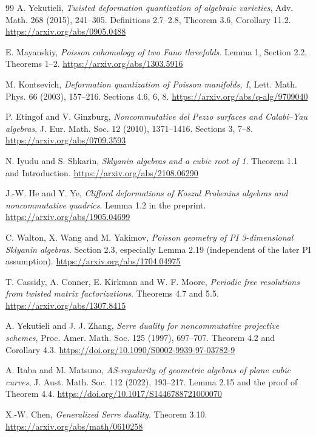 \documentclass[a4paper,11pt]{ltjsarticle}
\theoremstyle{definition}
\begin{document}
\begin{thebibliography}{99}
\small
{}
A. Yekutieli,
\emph{Twisted deformation quantization of algebraic varieties},
Adv. Math. 268 (2015), 241--305.
Definitions 2.7--2.8, Theorem 3.6, Corollary 11.2.
\url{https://arxiv.org/abs/0905.0488}

E. Mayanskiy,
\emph{Poisson cohomology of two Fano threefolds}.
Lemma 1, Section 2.2, Theorems 1--2.
\url{https://arxiv.org/abs/1303.5916}

M. Kontsevich,
\emph{Deformation quantization of Poisson manifolds, I},
Lett. Math. Phys. 66 (2003), 157--216.
Sections 4.6, 6, 8.
\url{https://arxiv.org/abs/q-alg/9709040}

P. Etingof and V. Ginzburg,
\emph{Noncommutative del Pezzo surfaces and Calabi--Yau algebras},
J. Eur. Math. Soc. 12 (2010), 1371--1416.
Sections 3, 7--8.
\url{https://arxiv.org/abs/0709.3593}

N. Iyudu and S. Shkarin,
\emph{Sklyanin algebras and a cubic root of 1}.
Theorem 1.1 and Introduction.
\url{https://arxiv.org/abs/2108.06290}

J.-W. He and Y. Ye,
\emph{Clifford deformations of Koszul Frobenius algebras and noncommutative quadrics}.
Lemma 1.2 in the preprint.
\url{https://arxiv.org/abs/1905.04699}

C. Walton, X. Wang and M. Yakimov,
\emph{Poisson geometry of PI 3-dimensional Sklyanin algebras}.
Section 2.3, especially Lemma 2.19 (independent of the later PI assumption).
\url{https://arxiv.org/abs/1704.04975}

T. Cassidy, A. Conner, E. Kirkman and W. F. Moore,
\emph{Periodic free resolutions from twisted matrix factorizations}.
Theorems 4.7 and 5.5.
\url{https://arxiv.org/abs/1307.8415}

A. Yekutieli and J. J. Zhang,
\emph{Serre duality for noncommutative projective schemes},
Proc. Amer. Math. Soc. 125 (1997), 697--707.
Theorem 4.2 and Corollary 4.3.
\url{https://doi.org/10.1090/S0002-9939-97-03782-9}

A. Itaba and M. Matsuno,
\emph{AS-regularity of geometric algebras of plane cubic curves},
J. Aust. Math. Soc. 112 (2022), 193--217.
Lemma 2.15 and the proof of Theorem 4.4.
\url{https://doi.org/10.1017/S1446788721000070}

X.-W. Chen,
\emph{Generalized Serre duality}.
Theorem 3.10.
\url{https://arxiv.org/abs/math/0610258}


\end{thebibliography}
\end{document}
